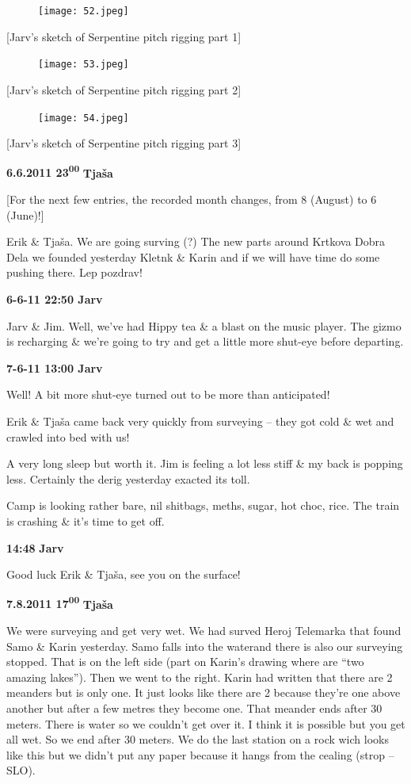 \begin{figure}[htbp]
\centering
\texttt{[image: 52.jpeg]}
\caption{}
\end{figure}

{[}Jarv's sketch of Serpentine pitch rigging part 1{]}

\begin{figure}[htbp]
\centering
\texttt{[image: 53.jpeg]}
\caption{}
\end{figure}

{[}Jarv's sketch of Serpentine pitch rigging part 2{]}

\begin{figure}[htbp]
\centering
\texttt{[image: 54.jpeg]}
\caption{}
\end{figure}

{[}Jarv's sketch of Serpentine pitch rigging part 3{]}

\textbf{6.6.2011 23\textsuperscript{00}} \textbf{Tjaša}

{[}For the next few entries, the recorded month changes, from 8 (August)
to 6 (June)!{]}

Erik \& Tjaša. We are going surving (?) The new parts around Krtkova
Dobra Dela we founded yesterday Kletnk \& Karin and if we will have time
do some pushing there. Lep pozdrav!

\textbf{6-6-11 22:50 Jarv}

Jarv \& Jim. Well, we've had Hippy tea \& a blast on the music player.
The gizmo is recharging \& we're going to try and get a little more
shut-eye before departing.

\textbf{7-6-11 13:00 Jarv}

Well! A bit more shut-eye turned out to be more than anticipated!

Erik \& Tjaša came back very quickly from surveying -- they got cold \&
wet and crawled into bed with us!

A very long sleep but worth it. Jim is feeling a lot less stiff \& my
back is popping less. Certainly the derig yesterday exacted its toll.

Camp is looking rather bare, nil shitbags, meths, sugar, hot choc, rice.
The train is crashing \& it's time to get off.

\textbf{14:48} \textbf{Jarv}

Good luck Erik \& Tjaša, see you on the surface!

\textbf{7.8.2011 17\textsuperscript{00}} \textbf{Tjaša}

We were surveying and get very wet. We had surved Heroj Telemarka that
found Samo \& Karin yesterday. Samo falls into the waterand there is
also our surveying stopped. That is on the left side (part on Karin's
drawing where are ``two amazing lakes''). Then we went to the right.
Karin had written that there are 2 meanders but is only one. It just
looks like there are 2 because they're one above another but after a few
metres they become one. That meander ends after 30 meters. There is
water so we couldn't get over it. I think it is possible but you get all
wet. So we end after 30 meters. We do the last station on a rock wich
looks like this but we didn't put any paper because it hangs from the
cealing (strop -- SLO).

